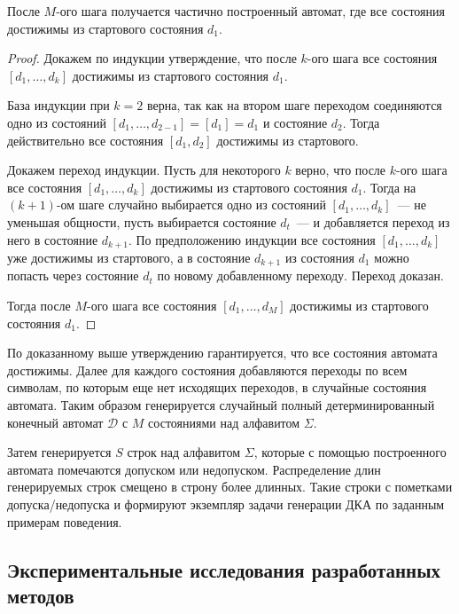 \begin{theorem}
  После $M$-ого шага получается частично построенный автомат, где все состояния достижимы из стартового состояния $d_{1}$.
  \begin{proof}
    Докажем по индукции утверждение, что после $k$-ого шага все состояния $\left[d_{1},\ldots,d_{k}\right]$ достижимы из стартового состояния $d_{1}$.
    
    База индукции при $k = 2$ верна, так как на втором шаге переходом соединяются одно из состояний $\left[d_{1},\ldots,d_{2-1}\right]=\left[d_{1}\right]=d_{1}$ и состояние $d_{2}$.
    Тогда действительно все состояния $\left[d_{1},d_{2}\right]$ достижимы из стартового.
    
    Докажем переход индукции.
    Пусть для некоторого $k$ верно, что после $k$-ого шага все состояния $\left[d_{1},\ldots,d_{k}\right]$ достижимы из стартового состояния $d_{1}$.
    Тогда на $(k+1)$-ом шаге случайно выбирается одно из состояний $\left[d_{1},\ldots,d_{k}\right]$~--- не уменьшая общности, пусть выбирается состояние $d_{t}$~--- и добавляется переход из него в состояние $d_{k + 1}$.
    По предположению индукции все состояния $\left[d_{1},\ldots,d_{k}\right]$ уже достижимы из стартового, а в состояние $d_{k + 1}$ из состояния $d_{1}$ можно попасть через состояние $d_{t}$ по новому добавленному переходу.
    Переход доказан.

    Тогда после $M$-ого шага все состояния $\left[d_{1},\ldots,d_{M}\right]$ достижимы из стартового состояния $d_{1}$.
  \end{proof}
\end{theorem}

По доказанному выше утверждению гарантируется, что все состояния автомата достижимы.
Далее для каждого состояния добавляются переходы по всем символам, по которым еще нет исходящих переходов, в случайные состояния автомата.
Таким образом генерируется случайный полный детерминированный конечный автомат $\mathcal{D}$ с $M$ состояниями над алфавитом $\Sigma$. 

Затем генерируется $S$ строк над алфавитом $\Sigma$, которые с помощью построенного автомата помечаются допуском или недопуском.
Распределение длин генерируемых строк смещено в строну более длинных.
Такие строки с пометками допуска/недопуска и формируют экземпляр задачи генерации ДКА по заданным примерам поведения.


\subsection{Экспериментальные исследования разработанных методов}
\label{sec:space:results:results}

